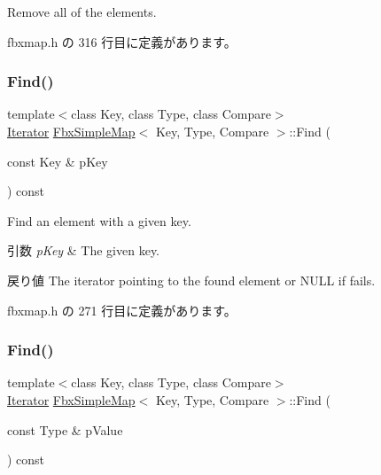 Remove all of the elements. 



 fbxmap.\+h の 316 行目に定義があります。

\mbox{\label{class_fbx_simple_map_a83632d1ae605470b24d92ae8d6fc011f}} 
\subsubsection{\texorpdfstring{Find()}{Find()}\hspace{0.1cm}{\footnotesize\ttfamily [1/2]}}
{\footnotesize\ttfamily template$<$class Key, class Type, class Compare$>$ \\
\hyperlink{class_fbx_simple_map_aaa589eb5e1ccdd11dffd018f3212e13e}{Iterator} \hyperlink{class_fbx_simple_map}{Fbx\+Simple\+Map}$<$ Key, Type, Compare $>$\+::Find (\begin{DoxyParamCaption}\item[{const Key \&}]{p\+Key }\end{DoxyParamCaption}) const\hspace{0.3cm}{\ttfamily [inline]}}

Find an element with a given key. 
\begin{DoxyParams}{引数}
{\em p\+Key} & The given key. \\
\hline
\end{DoxyParams}
\begin{DoxyReturn}{戻り値}
The iterator pointing to the found element or N\+U\+LL if fails. 
\end{DoxyReturn}


 fbxmap.\+h の 271 行目に定義があります。

\mbox{\label{class_fbx_simple_map_a5a015127a73c38a32b31a753e239159b}} 
\subsubsection{\texorpdfstring{Find()}{Find()}\hspace{0.1cm}{\footnotesize\ttfamily [2/2]}}
{\footnotesize\ttfamily template$<$class Key, class Type, class Compare$>$ \\
\hyperlink{class_fbx_simple_map_aaa589eb5e1ccdd11dffd018f3212e13e}{Iterator} \hyperlink{class_fbx_simple_map}{Fbx\+Simple\+Map}$<$ Key, Type, Compare $>$\+::Find (\begin{DoxyParamCaption}\item[{const Type \&}]{p\+Value }\end{DoxyParamCaption}) const\hspace{0.3cm}{\ttfamily [inline]}}

